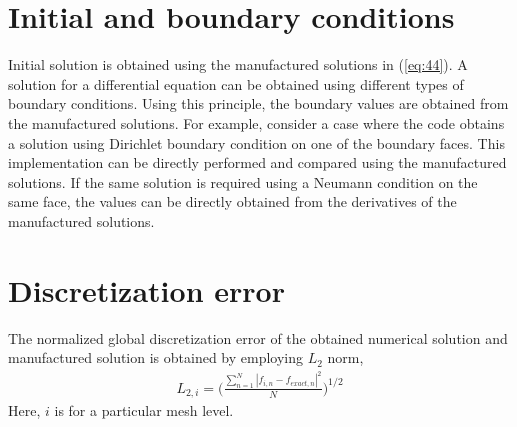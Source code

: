 \section{Initial and boundary conditions}
\hspace{0.25cm}Initial solution is obtained using the manufactured solutions in (\ref{eq:44}). A solution for a differential equation can be obtained using different types of boundary conditions. Using this principle, the boundary values are obtained from the manufactured solutions. For example, consider a case where the code obtains a solution using Dirichlet boundary condition on one of the boundary faces. This implementation can be directly performed and compared using the manufactured solutions. If the same solution is required using a Neumann condition on the same face, the values can be directly obtained from the derivatives of the manufactured solutions. 
\section{Discretization error}
\hspace{0.25cm}The normalized global discretization error of the obtained numerical solution and manufactured solution is obtained by employing $L_2$ norm,\\
\begin{equation}
\begin{gathered}
\label{eq:l2norm}
L_{2,i}=\Big(\frac{\sum_{n=1}^{N}|f_{i,n}-f_{exact,n}|^2}{N}\Big)^{1/2}
\end{gathered}
\end{equation}
Here, $i$ is for a particular mesh level.
\newpage
